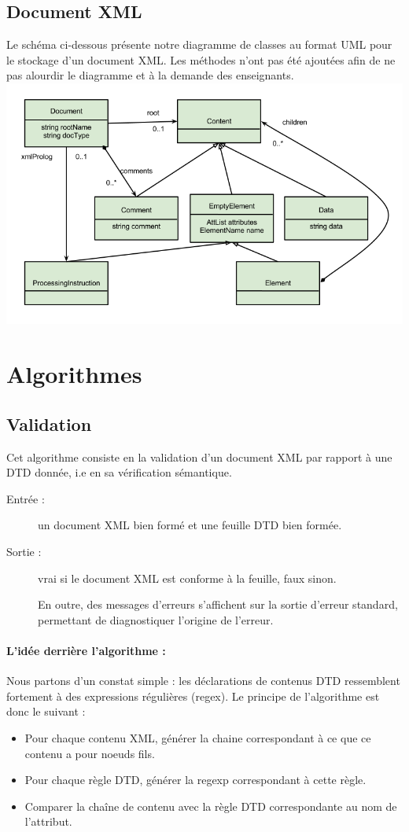 \documentclass[10pt,a4paper]{article}
\begin{document}
\subsection{Document XML}
Le schéma ci-dessous présente notre diagramme de classes au format UML pour le stockage d'un document XML. Les méthodes n'ont pas été ajoutées afin de ne pas alourdir le diagramme et à la demande des enseignants.
\includegraphics[scale=0.65]{DiagrammedeclasseXML.png} 

\section{Algorithmes}
\subsection{Validation}
Cet algorithme consiste en la validation d'un document XML par rapport à une DTD donnée, i.e en sa vérification sémantique.

\begin{description}
\item[Entrée :] un document XML bien formé et une feuille DTD bien formée.
\item[Sortie :] vrai si le document XML est conforme à la feuille, faux sinon.

En outre, des messages d'erreurs s'affichent sur la sortie d'erreur standard, permettant de diagnostiquer l'origine de l'erreur.
\end{description}

\paragraph{L'idée derrière l'algorithme :}
Nous partons d'un constat simple : les déclarations de contenus DTD ressemblent fortement à des expressions régulières (regex). Le principe de l'algorithme est donc le suivant :
\begin{itemize}
\item Pour chaque contenu XML, générer la chaine correspondant à ce que ce contenu a pour noeuds fils.
\item Pour chaque règle DTD, générer la regexp correspondant à cette règle.
\item Comparer la chaîne de contenu avec la règle DTD correspondante au nom de l'attribut.
\end{itemize}
\end{document}
